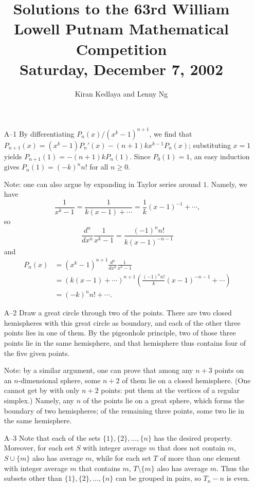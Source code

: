 \documentclass[amssymb,twocolumn,pra,10pt,aps]{revtex4-1}
\begin{document}
\title{Solutions to the 63rd William Lowell Putnam Mathematical Competition \\
    Saturday, December 7, 2002}
\author{Kiran Kedlaya and Lenny Ng}
\noaffiliation
\maketitle

\begin{itemize}

\item[A--1]
By differentiating $P_n(x)/(x^k-1)^{n+1}$, we find that
$P_{n+1}(x) = (x^k-1)P_n'(x)-(n+1)kx^{k-1}P_n(x)$; substituting
$x=1$ yields $P_{n+1}(1) = -(n+1)k P_n(1)$.  Since $P_0(1)=1$, an
easy induction gives $P_n(1) = (-k)^n n!$ for all $n \geq 0$.

Note: one can also argue by expanding in Taylor series around $1$.
Namely, we have
\[
\frac{1}{x^k - 1} = \frac{1}{k(x-1) + \cdots}
= \frac{1}{k} (x-1)^{-1} + \cdots,
\]
so
\[
\frac{d^n}{dx^n} \frac{1}{x^k - 1}
= \frac{(-1)^n n!}{k (x-1)^{-n-1}}
\]
and
\begin{align*}
P_n(x) &= (x^k - 1)^{n+1} \frac{d^n}{dx^n} \frac{1}{x^k - 1} \\
&= (k (x-1) + \cdots)^{n+1} \left( \frac{(-1)^n n!}{k}(x-1)^{-n-1}
+ \cdots \right) \\
&= (-k)^n n! + \cdots.
\end{align*}

\item[A--2]
Draw a great circle through two of the points. There are two
closed hemispheres with this great circle as boundary, and each of
the other three points lies in one of them. By the pigeonhole principle,
two of those three points lie in the same hemisphere, and that hemisphere
thus contains four of the five given points.

Note: by a similar argument, one can prove that among any $n+3$ points on
an $n$-dimensional sphere, some $n+2$ of them lie on a closed hemisphere.
(One cannot get by with only $n+2$ points: put them at the vertices of
a regular simplex.)
Namely, any $n$ of the points lie on a great sphere, which forms the boundary
of two hemispheres; of the remaining three points, some two lie in the
same hemisphere.

\item[A--3]
Note that each of the sets $\{1\}, \{2\}, \dots, \{n\}$ has the
desired property. Moreover, for each set $S$ with integer average $m$
that does not contain $m$, $S \cup \{m\}$ also has average $m$,
while for each set $T$ of more than one element with integer average
$m$ that contains $m$, $T \setminus \{m\}$ also has average $m$.
Thus the subsets other than $\{1\}, \{2\}, \dots, \{n\}$ can be grouped
in pairs, so $T_n - n$ is even.


\end{itemize}
\end{document}
